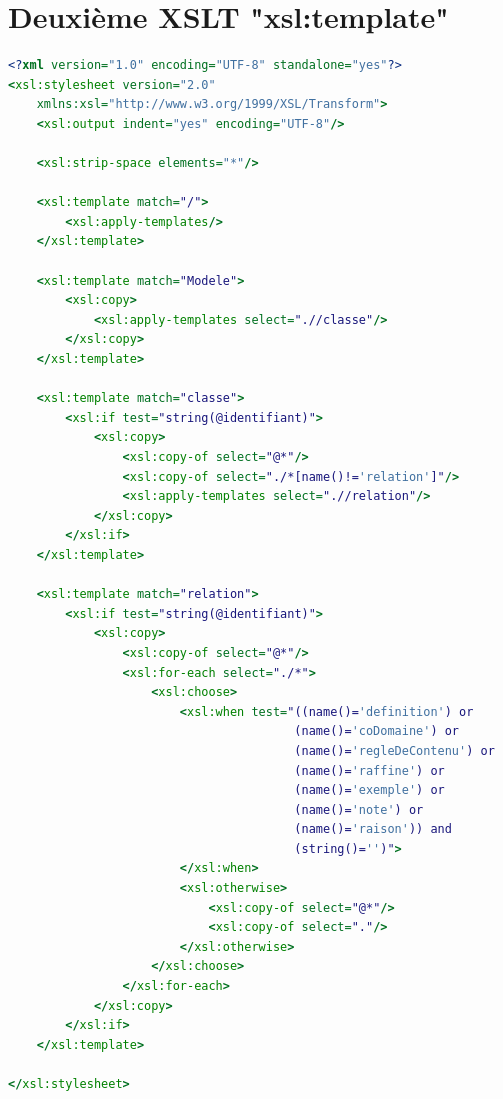 \documentclass[11pt]{report}
\begin{document}
\section{Deuxième XSLT "xsl:template"}
\begin{lstlisting}[language=XSLT]
<?xml version="1.0" encoding="UTF-8" standalone="yes"?>
<xsl:stylesheet version="2.0"
    xmlns:xsl="http://www.w3.org/1999/XSL/Transform">
    <xsl:output indent="yes" encoding="UTF-8"/>
    
    <xsl:strip-space elements="*"/>

    <xsl:template match="/">
        <xsl:apply-templates/>
    </xsl:template>

    <xsl:template match="Modele">
        <xsl:copy>
            <xsl:apply-templates select=".//classe"/>
        </xsl:copy>
    </xsl:template>

    <xsl:template match="classe">
        <xsl:if test="string(@identifiant)">
            <xsl:copy>
                <xsl:copy-of select="@*"/>
                <xsl:copy-of select="./*[name()!='relation']"/>
                <xsl:apply-templates select=".//relation"/>
            </xsl:copy>
        </xsl:if>
    </xsl:template>

    <xsl:template match="relation">
        <xsl:if test="string(@identifiant)">
            <xsl:copy>
                <xsl:copy-of select="@*"/>
                <xsl:for-each select="./*">
                    <xsl:choose>
                        <xsl:when test="((name()='definition') or
                                        (name()='coDomaine') or 
                                        (name()='regleDeContenu') or
                                        (name()='raffine') or 
                                        (name()='exemple') or
                                        (name()='note') or
                                        (name()='raison')) and 
                                        (string()='')">
                        </xsl:when>
                        <xsl:otherwise>
                            <xsl:copy-of select="@*"/>
                            <xsl:copy-of select="."/>
                        </xsl:otherwise>
                    </xsl:choose>
                </xsl:for-each>
            </xsl:copy>
        </xsl:if>
    </xsl:template>

</xsl:stylesheet>

\end{lstlisting}
\end{document}
